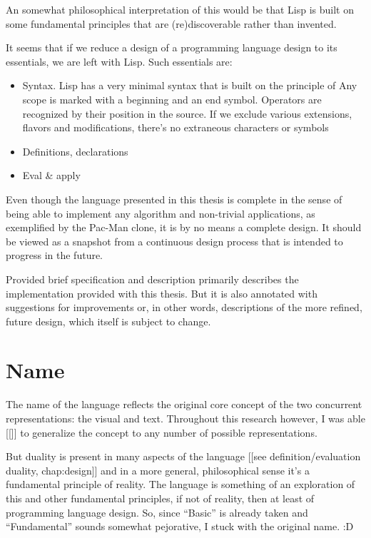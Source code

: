 An somewhat philosophical interpretation of this would be that Lisp is built on some fundamental principles that are (re)discoverable rather than invented.


It seems that if we reduce a design of a programming language design to its essentials, we are left with Lisp. Such essentials are:
\begin{itemize}
    \item Syntax. Lisp has a very minimal syntax that is built on the principle of %
    Any scope is marked with a beginning and an end symbol. Operators are recognized by their position in the source. If we exclude various extensions, flavors and modifications, there's no extraneous characters or symbols
    \item Definitions, declarations
    \item Eval \& apply
\end{itemize}

Even though the language presented in this thesis is complete in the sense of being able to implement any algorithm and non-trivial applications, as exemplified by the Pac-Man clone, it is by no means a complete design. It should be viewed as a snapshot from a continuous design process that is intended to progress in the future.

Provided brief specification and description primarily describes the implementation provided with this thesis. But it is also annotated with suggestions for improvements or, in other words, descriptions of the more refined, future design, which itself is subject to change.

\section{Name}
The name of the language reflects the original core concept of the two concurrent representations: the visual and text. Throughout this research however, I was able [[]] to generalize the concept to any number of possible representations.

But duality is present in many aspects of the language [[see definition/evaluation duality, chap:design]] and in a more general, philosophical sense it's a fundamental principle of reality. The language is something of an exploration of this and other fundamental principles, if not of reality, then at least of programming language design. So, since ``Basic'' is already taken and ``Fundamental'' sounds somewhat pejorative, I stuck with the original name. 
:D

